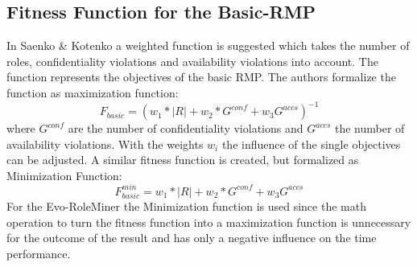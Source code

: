         \subsection{Fitness Function for the Basic-RMP}
        In Saenko \& Kotenko\cite{saenko2012design} a weighted function is suggested which takes the number of roles, confidentiality violations and availability violations into account. The function represents the objectives of the basic RMP. The authors formalize the function as maximization function:        
        \begin{equation}\label{eq:FBasic}
	        F_{basic} = (w_1 * |R| + w_2 * G^{conf} + w_3 G^{accs})^{-1}
	    \end{equation}	    
	    where $G^{conf}$ are the number of confidentiality violations and $G^{accs}$ the number of availability violations. With the weights $w_i$ the influence of the single objectives can be adjusted. A similar fitness function is created, but formalized as Minimization Function:	    
	    \begin{equation}\label{eq:FBasicMin}
		    F_{basic}^{min} = w_1 * |R| + w_2 * G^{conf} + w_3 G^{accs}
		\end{equation}		
		For the Evo-RoleMiner the Minimization function is used since the math operation to turn the fitness function into a maximization function is unnecessary for the outcome of the result and has only a negative influence on the time performance.
		
